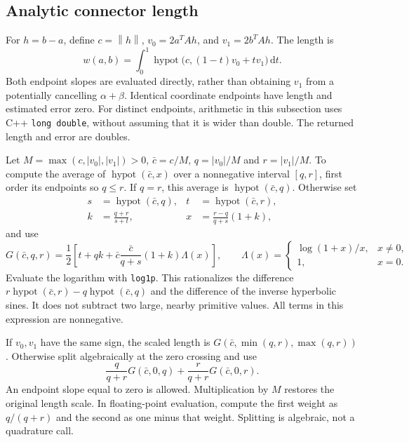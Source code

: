 \documentclass[11pt,letterpaper]{article}
\newcommand{\norm}[1]{\left\lVert#1\right\rVert}
\newcommand{\dd}{\,\mathrm{d}}
\newcommand{\src}[1]{\nolinkurl{#1}}
\begin{document}
\subsection{Analytic connector length}
\label{sec:cpp-analytic}

For $h=b-a$, define $c=\norm h$, $v_0=2a^T A h$, and $v_1=2b^T A h$.
The length is
\begin{equation}\label{eq:cpp-integral}
 w(a,b)=\int_0^1\operatorname{hypot}\bigl(c,(1-t)v_0+tv_1\bigr)\dd t.
\end{equation}
Both endpoint slopes are evaluated directly, rather than obtaining $v_1$
from a potentially cancelling $\alpha+\beta$. Identical coordinate endpoints
have length and estimated error zero. For distinct endpoints, arithmetic in
this subsection uses C++ \src{long double}, without assuming that it is
wider than double. The returned length and error are doubles.

Let $M=\max(c,|v_0|,|v_1|)>0$, $\bar c=c/M$, $q=|v_0|/M$ and
$r=|v_1|/M$. To compute the average of $\operatorname{hypot}(\bar c,x)$
over a nonnegative interval $[q,r]$, first order its endpoints so $q\le r$.
If $q=r$, this average is $\operatorname{hypot}(\bar c,q)$. Otherwise set
\begin{align*}
 s&=\operatorname{hypot}(\bar c,q),&t&=\operatorname{hypot}(\bar c,r),\\
 k&=\frac{q+r}{s+t},&x&=\frac{r-q}{q+s}(1+k),
\end{align*}
and use
\begin{equation}\label{eq:cpp-divdiff}
 G(\bar c,q,r)=\frac12\left[
 t+qk+\bar c\frac{\bar c}{q+s}(1+k)\Lambda(x)\right],\qquad
 \Lambda(x)=\begin{cases}\log(1+x)/x,&x\ne0,\\1,&x=0.\end{cases}
\end{equation}
Evaluate the logarithm with \src{log1p}. This rationalizes the difference
$r\operatorname{hypot}(\bar c,r)-q\operatorname{hypot}(\bar c,q)$ and
the difference of the inverse hyperbolic sines. It does not subtract two
large, nearby primitive values. All terms in this expression are nonnegative.

If $v_0,v_1$ have the same sign, the scaled length is
$G(\bar c,\min(q,r),\max(q,r))$. Otherwise split algebraically at the zero
crossing and use
\[
 \frac{q}{q+r}G(\bar c,0,q)+\frac{r}{q+r}G(\bar c,0,r).
\]
An endpoint slope equal to zero is allowed. Multiplication by $M$ restores
the original length scale. In floating-point evaluation, compute the first
weight as $q/(q+r)$ and the second as one minus that weight. Splitting is
algebraic, not a quadrature call.
\end{document}
